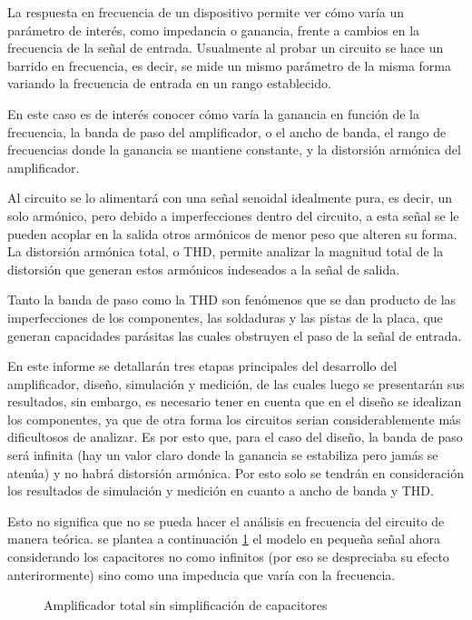 La respuesta en frecuencia de un dispositivo permite ver cómo varía un parámetro de interés, como impedancia o ganancia, frente a cambios en la frecuencia de la señal de entrada. Usualmente al probar un circuito se hace un barrido en frecuencia, es decir, se mide un mismo parámetro de la misma forma variando la frecuencia de entrada en un rango establecido.

En este caso es de interés conocer cómo varía la ganancia en función de la frecuencia, la banda de paso del amplificador, o el ancho de banda, el rango de frecuencias donde la ganancia se mantiene constante, y la distorsión armónica del amplificador. 

Al circuito se lo alimentará con una señal senoidal idealmente pura, es decir, un solo armónico, pero debido a imperfecciones dentro del circuito, a esta señal se le pueden acoplar en la salida otros armónicos de menor peso que alteren su forma. La distorsión armónica total, o THD, permite analizar la magnitud total de la distorsión que generan estos armónicos indeseados a la señal de salida.

Tanto la banda de paso como la THD son fenómenos que se dan producto de las imperfecciones de los componentes, las soldaduras y las pistas de la placa, que generan capacidades parásitas las cuales obstruyen el paso de la señal de entrada. 

En este informe se detallarán tres etapas principales del desarrollo del amplificador, diseño, simulación y medición, de las cuales luego se presentarán sus resultados, sin embargo, es necesario tener en cuenta que en el diseño se idealizan los componentes, ya que de otra forma los circuitos serian considerablemente más dificultosos de analizar. Es por esto que, para el caso del diseño, la banda de paso será infinita (hay un valor claro donde la ganancia se estabiliza pero jamás se atenúa) y no habrá distorsión armónica. Por esto solo se tendrán en consideración los resultados de simulación y medición en cuanto a ancho de banda y THD.

Esto no significa que no se pueda hacer el análisis en frecuencia del circuito de manera teórica. se plantea a continuación \cref{AmpconC} el modelo en pequeña señal ahora considerando los capacitores no como  infinitos (por eso se despreciaba su efecto anterirormente) sino como una impedncia que varía con la frecuencia.

\begin{figure}
  \centering
  \resizebox{\textwidth}{!}{
    
  }
  \caption{Amplificador total sin simplificación de capacitores}
  \label{AmpconC}
\end{figure}


